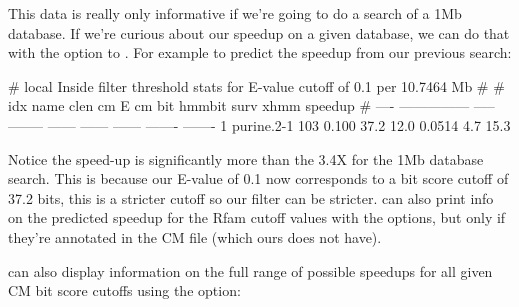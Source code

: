This data is really only informative if we're going to do a search of
a 1Mb database. If we're curious about our speedup on a given
database, we can do that with the  option to
. For example to predict the speedup from our previous
search: 


\begin{sreoutput}
# local Inside filter threshold stats for E-value cutoff of  0.1 per 10.7464 Mb
#
#  idx  name              clen      cm E  cm bit  hmmbit    surv     xhmm  speedup
# ----  ---------------  -----  --------  ------  ------  ------  -------  -------
     1  purine.2-1         103     0.100    37.2    12.0  0.0514      4.7     15.3
\end{sreoutput}

Notice the speed-up is significantly more than the 3.4X for the 1Mb
database search. This is because our E-value of 0.1 now corresponds to
a bit score cutoff of 37.2 bits, this is a stricter cutoff so our
filter can be stricter. can also print info on the
predicted speedup for the Rfam cutoff values with the  options, but only if they're annotated in the CM file
(which ours does not have). 

 can also display information on the full range of
possible speedups for all given CM bit score cutoffs using the
 option: 


